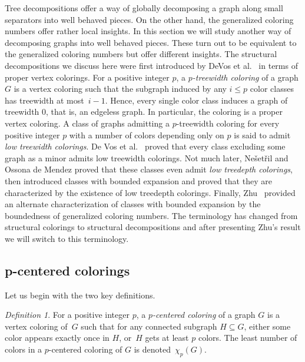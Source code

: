 \documentclass[1p,number,a4paper]{elsarticle}
\theoremstyle{remark}
\newtheorem{definition}[theorem]{Definition}
\begin{document}
Tree decompositions offer a way of globally decomposing a graph 
along small separators into well behaved pieces. 
On the other hand, the generalized coloring numbers offer rather local insights. 
In this section we will study another way of decomposing graphs into well behaved pieces. These turn out to be equivalent to the generalized coloring numbers but offer different insights. 
The structural decompositions we discuss here were first introduced by DeVos et al.~\cite{devos2004excluding} in terms of proper vertex colorings. 
For a positive integer $p$, a \emph{$p$-treewidth coloring} of a graph $G$ is a vertex coloring such that the subgraph induced by any $i\leq p$ color classes has treewidth at most~$i-1$. 
Hence, every single color class induces a graph of treewidth $0$, that is, an edgeless graph. 
In particular, the coloring is a proper vertex coloring. 
A class of graphs admitting a $p$-treewidth coloring for every positive integer $p$ with a number of colors depending only on $p$ is said to admit 
\emph{low treewidth colorings}. De Vos et al.~\cite{devos2004excluding} proved that every class excluding some graph as a minor admits low treewidth colorings. 
Not much later, Ne\v{s}et\v{r}il and Ossona de Mendez proved that these classes even admit \emph{low treedepth colorings},
then introduced classes with bounded expansion and proved \cite{nevsetvril2008grad} that they  are characterized by the existence of low treedepth colorings. 
Finally, Zhu~\cite{zhu2009colouring} provided an alternate characterization of classes with bounded expansion by the boundedness of generalized coloring numbers.
The terminology has changed from structural colorings to structural decompositions and 
after presenting Zhu's result we will switch to this terminology. 

\subsection{p-centered colorings}

Let us begin with the two key definitions. 

\begin{definition}
  For a positive integer $p$, a \emph{$p$-centered coloring} of a graph $G$ is a vertex coloring of~$G$ such that for any connected subgraph $H\subseteq G$, either some color appears exactly once in $H$, or~$H$ gets at least $p$ colors. 
  The least number of colors in a $p$-centered coloring of $G$ is denoted~$\chi_p(G)$. 
\end{definition}
\end{document}
